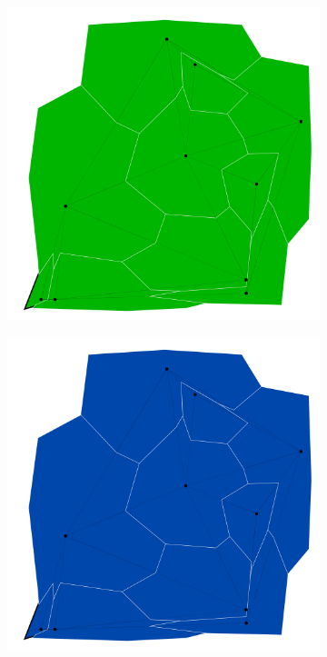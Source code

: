 \documentclass{article}
\begin{document}
	
	\begin{figure}[h!]
		\centering
		\begin{subfigure}{0.18\textwidth}
			\centering
			\includegraphics[width=\textwidth]{images/sequences/genetic/genetic_I00001}
			\caption{}
			
		\end{subfigure}
		\;
		\begin{subfigure}{0.18\textwidth}
			\centering
			\includegraphics[width=\textwidth]{images/sequences/genetic/genetic_I00002}
			\caption{}
			

\end{subfigure}
\end{figure}
\end{document}
